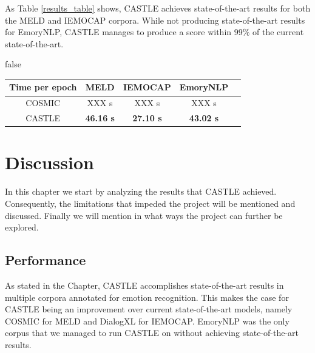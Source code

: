 \documentclass[nofilelist]{cslthse-msc}
\begin{document}
As Table \ref{results_table} shows, CASTLE achieves state-of-the-art results for both the MELD and IEMOCAP corpora. While not producing state-of-the-art results for EmoryNLP, CASTLE manages to produce a score within 99$\%$ of the current state-of-the-art.





\ifx false
\begin{table}[h!]
\begin{tabular}{|c|c|c|c|c|}
\hline
Time per epoch & MELD             & IEMOCAP          & EmoryNLP          \\ \hline
COSMIC         & XXX s            & XXX s          & XXX s                  \\ \hline
CASTLE         & \textbf{46.16 s} & \textbf{27.10 s} & \textbf{43.02 s}       \\ \hline
\end{tabular}
\end{table}
\fi





\chapter{Discussion}
In this chapter we start by analyzing the results that CASTLE achieved. Consequently, the limitations that impeded the project will be mentioned and discussed. Finally we will mention in what ways the project can further be explored. 






\section{Performance}

As stated in the  Chapter, CASTLE accomplishes state-of-the-art results in multiple corpora annotated for emotion recognition. This makes the case for CASTLE being an improvement over current state-of-the-art models, namely COSMIC for MELD and DialogXL for IEMOCAP. EmoryNLP was the only corpus that we managed to run CASTLE on without achieving state-of-the-art results. 
\end{document}
